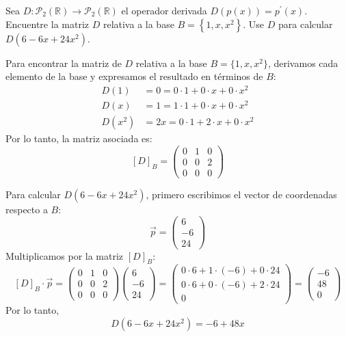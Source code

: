 \begin{prob}
Sea $D:\mathcal{P}_{2}(\mathbb{R}) \rightarrow \mathcal{P}_{2}(\mathbb{R})$ el operador derivada $D(p(x))=p^{\prime}(x).$ Encuentre la matriz $D$ relativa a la base $B=\left\lbrace 1,x,x^2  \right\rbrace.$ Use $D$ para calcular $D(6-6x+24x^2).$
\begin{myproof}
Para encontrar la matriz de $D$ relativa a la base $B = \{1, x, x^2\}$, derivamos cada elemento de la base y expresamos el resultado en términos de $B$:
\[
\begin{aligned}
D(1) &= 0 = 0\cdot 1 + 0\cdot x + 0\cdot x^2 \\
D(x) &= 1 = 1\cdot 1 + 0\cdot x + 0\cdot x^2 \\
D(x^2) &= 2x = 0\cdot 1 + 2\cdot x + 0\cdot x^2
\end{aligned}
\]
Por lo tanto, la matriz asociada es:
\[
[D]_B = \begin{pmatrix}
0 & 1 & 0 \\
0 & 0 & 2 \\
0 & 0 & 0
\end{pmatrix}
\]

Para calcular $D(6 - 6x + 24x^2)$, primero escribimos el vector de coordenadas respecto a $B$:
\[
\vec{p} = \begin{pmatrix} 6 \\ -6 \\ 24 \end{pmatrix}
\]
Multiplicamos por la matriz $[D]_B$:
\[
[D]_B \cdot \vec{p} = 
\begin{pmatrix}
0 & 1 & 0 \\
0 & 0 & 2 \\
0 & 0 & 0
\end{pmatrix}
\begin{pmatrix} 6 \\ -6 \\ 24 \end{pmatrix}
=
\begin{pmatrix}
0 \cdot 6 + 1 \cdot (-6) + 0 \cdot 24 \\
0 \cdot 6 + 0 \cdot (-6) + 2 \cdot 24 \\
0
\end{pmatrix}
=
\begin{pmatrix}
-6 \\ 48 \\ 0
\end{pmatrix}
\]
Por lo tanto,
\[
D(6 - 6x + 24x^2) = -6 + 48x
\]
\end{myproof}
\end{prob}

